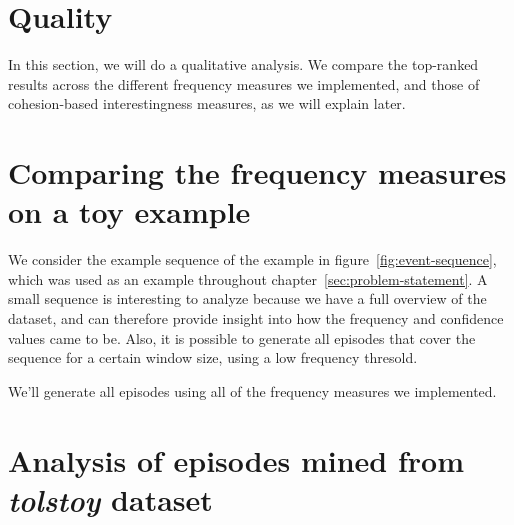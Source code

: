 \section{Quality}

In this section, we will do a qualitative analysis. We compare the top-ranked results across the different frequency measures we implemented, and those of cohesion-based interestingness measures, as we will explain later.

\section{Comparing the frequency measures on a toy example}

We consider the example sequence of the example in figure~\ref{fig:event-sequence}, which was used as an example throughout chapter~\ref{sec:problem-statement}. A small sequence is interesting to analyze because we have a full overview of the dataset, and can therefore provide insight into how the frequency and confidence values came to be. Also, it is possible to generate all episodes that cover the sequence for a certain window size, using a low frequency thresold.

We'll generate all episodes using all of the frequency measures we implemented.

\section{Analysis of episodes mined from \emph{tolstoy} dataset}

